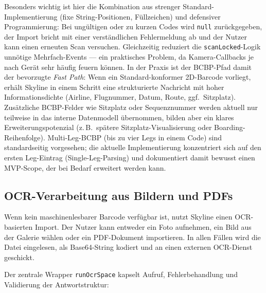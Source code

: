 Besonders wichtig ist hier die Kombination aus strenger Standard-Implementierung (fixe String-Positionen, Füllzeichen) und defensiver Programmierung:
Bei ungültigen oder zu kurzen Codes wird \texttt{null} zurückgegeben, der Import bricht mit einer verständlichen Fehlermeldung ab und der Nutzer kann einen erneuten Scan versuchen.
Gleichzeitig reduziert die \texttt{scanLocked}-Logik unnötige Mehrfach-Events --- ein praktisches Problem, da Kamera-Callbacks je nach Gerät sehr häufig feuern können.
In der Praxis ist der BCBP-Pfad damit der bevorzugte \emph{Fast Path}: Wenn ein Standard-konformer 2D-Barcode vorliegt, erhält Skyline in einem Schritt eine strukturierte Nachricht mit hoher Informationsdichte (Airline, Flugnummer, Datum, Route, ggf.\ Sitzplatz).
Zusätzliche BCBP-Felder wie Sitzplatz oder Sequenznummer werden aktuell nur teilweise in das interne Datenmodell übernommen, bilden aber ein klares Erweiterungspotenzial (z.\,B.\ spätere Sitzplatz-Visualisierung oder Boarding-Reihenfolge).
Multi-Leg-BCBP (bis zu vier Legs in einem Code) sind standardseitig vorgesehen; die aktuelle Implementierung konzentriert sich auf den ersten Leg-Eintrag (Single-Leg-Parsing) und dokumentiert damit bewusst einen MVP-Scope, der bei Bedarf erweitert werden kann.

\subsection{OCR-Verarbeitung aus Bildern und PDFs}

Wenn kein maschinenlesbarer Barcode verfügbar ist, nutzt Skyline einen OCR-basierten Import.
Der Nutzer kann entweder ein Foto aufnehmen, ein Bild aus der Galerie wählen oder ein PDF-Dokument importieren.
In allen Fällen wird die Datei eingelesen, als Base64-String kodiert und an einen externen OCR-Dienst geschickt.

Der zentrale Wrapper \texttt{runOcrSpace} kapselt Aufruf, Fehlerbehandlung und Validierung der Antwortstruktur:

